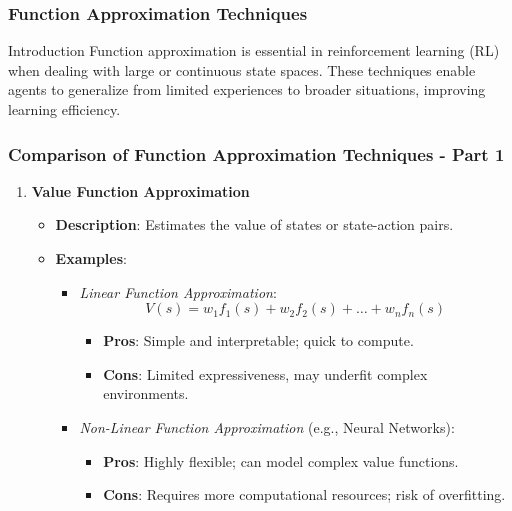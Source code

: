 \documentclass[aspectratio=169]{beamer}
\begin{document}
\begin{frame}[fragile]
    \frametitle{Function Approximation Techniques}
    \begin{block}{Introduction}
        Function approximation is essential in reinforcement learning (RL) when dealing with large or continuous state spaces. These techniques enable agents to generalize from limited experiences to broader situations, improving learning efficiency.
    \end{block}
\end{frame}

\begin{frame}[fragile]
    \frametitle{Comparison of Function Approximation Techniques - Part 1}
    \begin{enumerate}
        \item \textbf{Value Function Approximation}
        \begin{itemize}
            \item \textbf{Description}: Estimates the value of states or state-action pairs.
            \item \textbf{Examples}:
            \begin{itemize}
                \item \textit{Linear Function Approximation}:
                \begin{equation}
                    V(s) = w_1 f_1(s) + w_2 f_2(s) + \ldots + w_n f_n(s)
                \end{equation}
                \begin{itemize}
                    \item \textbf{Pros}: Simple and interpretable; quick to compute.
                    \item \textbf{Cons}: Limited expressiveness, may underfit complex environments.
                \end{itemize}
                
                \item \textit{Non-Linear Function Approximation} (e.g., Neural Networks):
                \begin{itemize}
                    \item \textbf{Pros}: Highly flexible; can model complex value functions.
                    \item \textbf{Cons}: Requires more computational resources; risk of overfitting.
                \end{itemize}
            \end{itemize}
        \end{itemize}
    \end{enumerate}
\end{frame}
\end{document}

